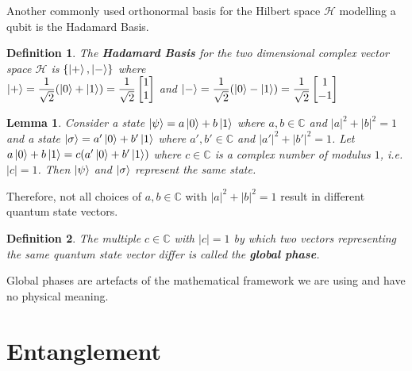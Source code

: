 \documentclass[12pt,twoside,fleqn]{report}
\theoremstyle{thmstyle}
\newtheorem{defn}{Definition}[chapter]
\newtheorem{lemma}{Lemma}[chapter]
\begin{document}
Another commonly used orthonormal basis for the Hilbert space $\mathcal{H}$ modelling a qubit is the Hadamard Basis.

\begin{defn}
The \textbf{Hadamard Basis} for the two dimensional complex vector space $\mathcal{H}$ is  $\{ \ket{+}, \ket{-} \}$ where \\
    $\ket{+} = \displaystyle\frac{1}{\sqrt 2} (\ket{0} + \ket{1}) = \frac{1}{\sqrt{2}} \begin{bmatrix} 1 \\ 1 \end{bmatrix}$ and $\ket{-} = \displaystyle\frac{1}{\sqrt 2} (\ket{0} - \ket{1}) = \frac{1}{\sqrt{2}} \begin{bmatrix} 1 \\ -1 \end{bmatrix}$
\end{defn}

\begin{samepage}
\begin{lemma}
Consider a state $\ket{\psi} = a \ket{0} + b \ket{1}$ where $a,b \in \mathbb{C}$ and $|a|^2 + |b|^2 = 1$ and a state $\ket{\sigma} = a' \ket{0} + b' \ket{1}$ where $a',b' \in \mathbb{C}$ and $|a'|^2 + |b'|^2 = 1$. Let $a \ket{0} + b \ket{1} = c (a' \ket{0} + b' \ket{1})$ where $c \in \mathbb{C}$ is a complex number of modulus $1$, i.e. $|c| = 1$. Then $\ket\psi$ and $\ket\sigma$ represent the same state.
\end{lemma}

Therefore, not all choices of $a, b \in \mathbb{C}$ with $|a|^2 + |b|^2 = 1$ result in different quantum state vectors. 
\begin{defn}
The multiple $c \in \mathbb{C}$ with $|c| = 1$ by which two vectors representing the same quantum state vector differ is called the \textbf{global phase}. 
\end{defn}
Global phases are artefacts of the mathematical framework we are using and have no physical meaning.
\end{samepage}



\pagebreak
\section{Entanglement}

\begin{comment}
x notation for tensor product of vectors
x Simple notation
x properties of tensor product of vectors
* orthonormal basis for tensor product space
* Inner product defined on space of tensor products of vectors
* Definition of tensor product of spaces -- Hilbert space
* Notation for tensor product of spaces
* Tensor product multiplication rules
* Principle of Entanglement
* Proof that most states are entangled
\end{comment}
\end{document}
